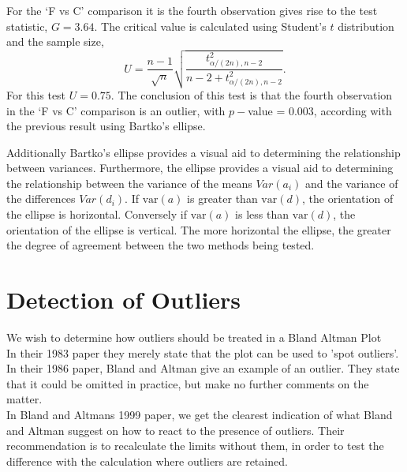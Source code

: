 \documentclass[12pt, a4paper]{report}
\theoremstyle{plain}
\theoremstyle{definition}
\theoremstyle{remark}
\begin{document}
	For the `F vs C' comparison it is the fourth observation gives
	rise to the test statistic, $G = 3.64$. The critical value is
	calculated using Student's $t$ distribution and the sample size,
	\[
	U = \frac{n-1}{\sqrt{n}} \sqrt{\frac{t_{\alpha/(2n),n-2}^2}{n - 2
			+ t_{\alpha/(2n),n-2}^2}}.
	\]
	For this test $U = 0.75$. The conclusion of this test is that the fourth observation in the `F vs C' comparison is an outlier, with $p-$value = 0.003, according with the previous result using Bartko's ellipse.
	
		
		Additionally Bartko's ellipse provides a visual aid to determining the
		relationship between variances. 
		Furthermore, the ellipse provides a visual aid to determining the relationship
		between the variance of the means $Var(a_{i})$ and the variance of the differences $Var(d_{i})$. If $\mbox{var}(a)$ is greater than $\mbox{var}(d)$, the orientation of the ellipse is horizontal. Conversely if $\mbox{var}(a)$ is less than $\mbox{var}(d)$, the orientation of the ellipse is vertical. The more horizontal the ellipse, the greater the degree of agreement between the two methods being tested.
		
		\newpage
	






\section{Detection of Outliers}
We wish to determine how outliers should be treated in a Bland
Altman Plot
\\
In their 1983 paper they merely state that the plot can be used to
'spot outliers'.
\\
In  their 1986 paper, Bland and Altman give an example of an
outlier. They state that it could be omitted in practice, but make
no further comments on the matter.
\\
In Bland and Altmans 1999 paper, we get the clearest indication of
what Bland and Altman suggest on how to react to the presence of
outliers. Their recommendation is to recalculate the limits
without them, in order to test the difference with the calculation
where outliers are retained.\\
\end{document}
